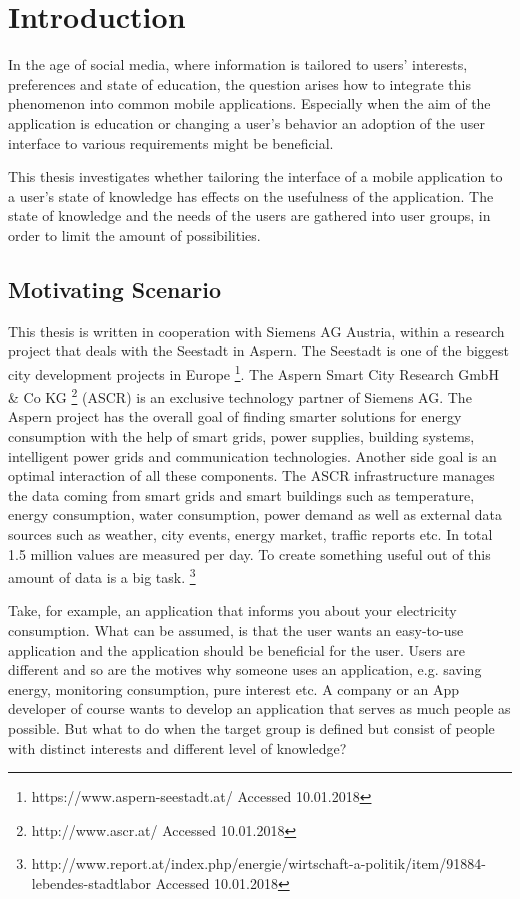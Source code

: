 \chapter{Introduction}

In the age of social media, where information is tailored to users' interests, preferences and state of education, the question arises how to integrate this phenomenon into common mobile applications. Especially when the aim of the application is education or changing a user's behavior an adoption of the user interface to various requirements might be beneficial.

This thesis investigates whether tailoring the interface of a mobile application to a user's state of knowledge has effects on the usefulness of the application. The state of knowledge and the needs of the users are gathered into user groups, in order to limit the amount of possibilities.


\section{Motivating Scenario}

This thesis is written in cooperation with Siemens AG Austria, within a research project that deals with the Seestadt in Aspern. The Seestadt is one of the biggest city development projects in Europe \footnote{https://www.aspern-seestadt.at/ Accessed 10.01.2018}. The Aspern Smart City Research GmbH \& Co KG \footnote{http://www.ascr.at/ Accessed 10.01.2018} (ASCR) is an exclusive technology partner of Siemens AG. The Aspern project has the overall goal of finding smarter solutions for energy consumption with the help of smart grids, power supplies, building systems, intelligent power grids and communication technologies. Another side goal is an optimal interaction of all these components. The ASCR infrastructure manages the data coming from smart grids and smart buildings such as temperature, energy consumption, water consumption, power demand as well as external data sources such as weather, city events, energy market, traffic reports etc. \cite{parreira2015role} In total 1.5 million values are measured per day. To create something useful out of this amount of data is a big task. \footnote{http://www.report.at/index.php/energie/wirtschaft-a-politik/item/91884-lebendes-stadtlabor Accessed 10.01.2018}

Take, for example, an application that informs you about your electricity consumption. What can be assumed, is that the user wants an easy-to-use application and the application should be beneficial for the user. Users are different and so are the motives why someone uses an application, e.g. saving energy, monitoring consumption, pure interest etc. A company or an App developer of course wants to develop an application that serves as much people as possible. But what to do when the target group is defined but consist of people with distinct interests and different level of knowledge?


